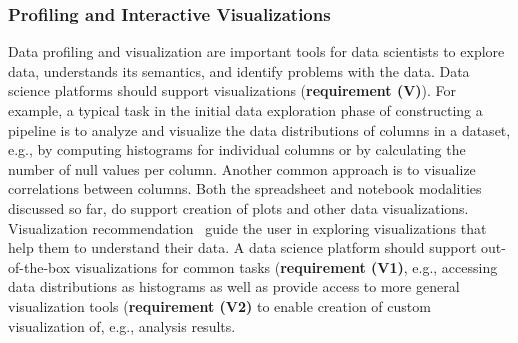 \subsubsection{Profiling and Interactive Visualizations}
\label{sec:inter-visu}
%
Data profiling and visualization are important tools for data scientists to explore data, understands its semantics, and identify problems with the data.
Data science platforms should support visualizations (\textbf{requirement (V)}). For example, a typical task in the initial data exploration phase of constructing a pipeline is to analyze and visualize the data distributions of columns in a dataset, e.g., by computing histograms for individual columns or by calculating the number of null values per column. Another common approach is to visualize correlations between columns. Both the spreadsheet and notebook modalities discussed so far, do support creation of plots and other data visualizations. Visualization recommendation~\cite{lee-21-l, hu-19-v} guide the user in exploring visualizations that help them to understand their data. A data science platform should support out-of-the-box visualizations  for common tasks (\textbf{requirement (V1)}, e.g., accessing data distributions as histograms as well as provide access to more general visualization tools (\textbf{requirement (V2)} to enable creation of custom visualization of, e.g., analysis results.

